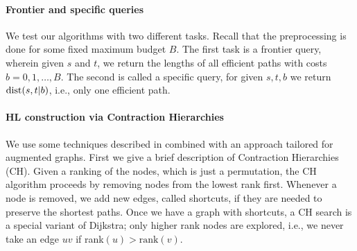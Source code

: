 %

\paragraph{Frontier and specific queries}
We test our algorithms with two different tasks.
Recall that the preprocessing is done for some fixed maximum budget $B$.
The first task is a frontier query, wherein given $s$ and $t$, we return the lengths of all efficient paths with costs $b=0,1,\ldots,B$.
The second is called a specific query, for given $s,t,b$ we return $\mbox{dist}(s,t|b)$, i.e., only one efficient path.
%
%

\paragraph{HL construction via Contraction Hierarchies}
We use some techniques described in \cite{hubimplem} combined with an approach tailored for augmented graphs.
First we give a brief description of Contraction Hierarchies (CH).
Given a ranking of the nodes, which is just a permutation, the CH algorithm proceeds by removing nodes from the lowest rank first.
Whenever a node is removed, we add new edges, called shortcuts, if they are needed to preserve the shortest paths.
Once we have a graph with shortcuts, a CH search is a special variant of Dijkstra; only higher rank nodes are explored, i.e., we never take an edge $uv$ if rank$(u)>\text{rank}(v)$. 

